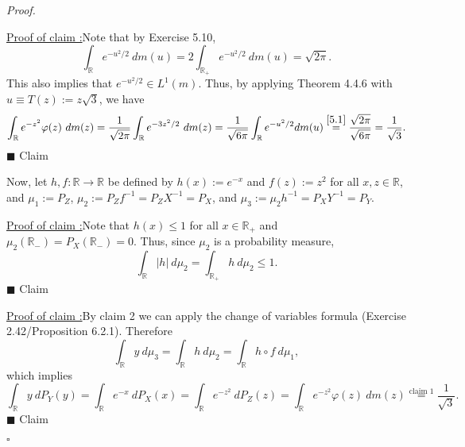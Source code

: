 \documentclass[12pt]{article}
\newcounter{ProofCounter}
\newcounter{ClaimCounter}[ProofCounter]
\newenvironment{Proof}{\stepcounter{ProofCounter}\textit{Proof.}}{\hfill$\square$}
\newenvironment{claim}[1]{\vspace{3mm}\stepcounter{ClaimCounter}\par\noindent\underline{\bf Claim \theClaimCounter:}\space#1}{}
\newenvironment{claimproof}[1]{\par\noindent\underline{Proof of claim \theClaimCounter:}\space#1}{\hfill $\blacksquare$ Claim \theClaimCounter}
\begin{document}
\begin{enumerate}[label=(\alph*)]
\begin{Proof}
\vspace{-5mm}
\begin{claimproof}
Note that by Exercise 5.10, 
\begin{equation}
\int_{\mathbb{R}}e^{-u^{2}/2}\ dm(u) = 2\int_{\mathbb{R}_{+}}e^{-u^{2}/2}\ dm(u) = \sqrt{2\pi}. 
\label{5.1}
\end{equation}
This also implies that $e^{-u^{2}/2} \in L^{1}(m)$. Thus, by applying Theorem 4.4.6 with $u \equiv T(z) := z\sqrt{3}$, we have 
\[ \int_{\mathbb{R}}e^{-z^{2}}\varphi(z)\ dm(z) = \frac{1}{\sqrt{2\pi}}\int_{\mathbb{R}}e^{-3z^{2}/2}\ dm(z) =
\frac{1}{\sqrt{6\pi}}\int_{\mathbb{R}}e^{-u^{2}/2}dm(u) \stackrel{\eqref{5.1}}{=} \frac{\sqrt{2\pi}}{\sqrt{6\pi}} = \frac{1}{\sqrt{3}}. \]
\end{claimproof}

Now, let $h,f : \mathbb{R} \rightarrow \mathbb{R}$ be defined by $h(x) := e^{-x}$ and $f(z) := z^{2}$ for all $x,z \in \mathbb{R}$, and $\mu_{1} :=
P_{Z}$, $\mu_{2} := P_{Z}f^{-1} = P_{Z}X^{-1} = P_{X}$, and $\mu_{3} := \mu_{2} h^{-1} = P_{X}Y^{-1} = P_{Y}$.

\begin{claimproof}
Note that $h(x) \leq 1$ for all $x \in \mathbb{R}_{+}$ and $\mu_{2}\left( \mathbb{R}_{-} \right) = P_{X}(\mathbb{R}_{-}) = 0$. Thus, since $\mu_{2}$
is a probability measure, 
\[ \int_{\mathbb{R}}|h|\ d\mu_{2} = \int_{\mathbb{R}_{+}}h\ d\mu_{2} \leq 1. \]
\end{claimproof}

\begin{claimproof}
By claim 2 we can apply the change of variables formula (Exercise 2.42/Proposition 6.2.1). Therefore
\[ \int_{\mathbb{R}}y\ d\mu_{3} = \int_{\mathbb{R}}h\ d\mu_{2} = \int_{\mathbb{R}}h\circ f\ d\mu_{1}, \]
which implies
\[ \int_{\mathbb{R}}y\ dP_{Y}(y) = \int_{\mathbb{R}}e^{-x}\ dP_{X}(x) = \int_{\mathbb{R}}e^{-z^{2}}\ dP_{Z}(z) = \int_{\mathbb{R}}e^{-z^{2}}\varphi(z)\ dm(z) 
\stackrel{\text{claim 1}}{=} \frac{1}{\sqrt{3}}. \]
\end{claimproof}


\end{Proof}
\end{enumerate}
\end{document}
